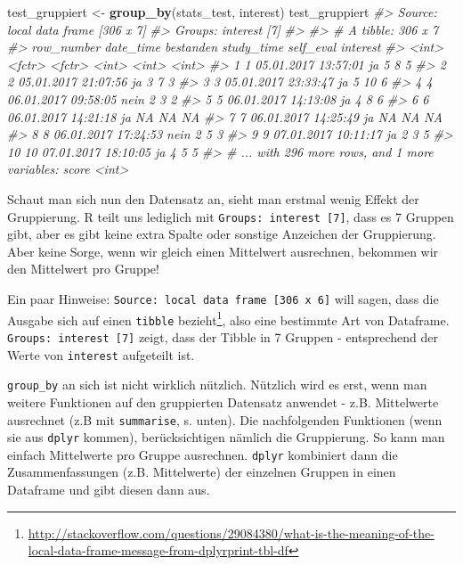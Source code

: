 \documentclass[12pt,ngerman,]{book}
\makeatletter
\newenvironment{Shaded}{\begin{snugshade}}{\end{snugshade}}
\newcommand{\KeywordTok}[1]{\textcolor[rgb]{0.13,0.29,0.53}{\textbf{{#1}}}}
\newcommand{\StringTok}[1]{\textcolor[rgb]{0.31,0.60,0.02}{{#1}}}
\newcommand{\CommentTok}[1]{\textcolor[rgb]{0.56,0.35,0.01}{\textit{{#1}}}}
\newcommand{\NormalTok}[1]{{#1}}
\let\rmarkdownfootnote\footnote%
\def\footnote{\protect\rmarkdownfootnote}
\newenvironment{kframe}{%
\medskip{}
\setlength{\fboxsep}{.8em}
 \def\at@end@of@kframe{}%
 \ifinner\ifhmode%
  \def\at@end@of@kframe{\end{minipage}}%
  \begin{minipage}{\columnwidth}%
 \fi\fi%
 \def\FrameCommand##1{\hskip\@totalleftmargin \hskip-\fboxsep
 \colorbox{shadecolor}{##1}\hskip-\fboxsep
     \hskip-\linewidth \hskip-\@totalleftmargin \hskip\columnwidth}%
 \MakeFramed {\advance\hsize-\width
   \@totalleftmargin\z@ \linewidth\hsize
   \@setminipage}}%
 {\par\unskip\endMakeFramed%
 \at@end@of@kframe}
\renewenvironment{Shaded}{\begin{kframe}}{\end{kframe}}
\theoremstyle{definition}
\theoremstyle{definition}
\theoremstyle{remark}
\makeatother
\begin{document}
\begin{Shaded}
\begin{Highlighting}[]
\NormalTok{test_gruppiert <-}\StringTok{ }\KeywordTok{group_by}\NormalTok{(stats_test, interest)}
\NormalTok{test_gruppiert}
\CommentTok{#> Source: local data frame [306 x 7]}
\CommentTok{#> Groups: interest [7]}
\CommentTok{#> }
\CommentTok{#> # A tibble: 306 x 7}
\CommentTok{#>    row_number           date_time bestanden study_time self_eval interest}
\CommentTok{#>         <int>              <fctr>    <fctr>      <int>     <int>    <int>}
\CommentTok{#>  1          1 05.01.2017 13:57:01        ja          5         8        5}
\CommentTok{#>  2          2 05.01.2017 21:07:56        ja          3         7        3}
\CommentTok{#>  3          3 05.01.2017 23:33:47        ja          5        10        6}
\CommentTok{#>  4          4 06.01.2017 09:58:05      nein          2         3        2}
\CommentTok{#>  5          5 06.01.2017 14:13:08        ja          4         8        6}
\CommentTok{#>  6          6 06.01.2017 14:21:18        ja         NA        NA       NA}
\CommentTok{#>  7          7 06.01.2017 14:25:49        ja         NA        NA       NA}
\CommentTok{#>  8          8 06.01.2017 17:24:53      nein          2         5        3}
\CommentTok{#>  9          9 07.01.2017 10:11:17        ja          2         3        5}
\CommentTok{#> 10         10 07.01.2017 18:10:05        ja          4         5        5}
\CommentTok{#> # ... with 296 more rows, and 1 more variables: score <int>}
\end{Highlighting}
\end{Shaded}

Schaut man sich nun den Datensatz an, sieht man erstmal wenig Effekt der
Gruppierung. R teilt uns lediglich mit
\texttt{Groups:\ interest\ {[}7{]}}, dass es 7 Gruppen gibt, aber es
gibt keine extra Spalte oder sonstige Anzeichen der Gruppierung. Aber
keine Sorge, wenn wir gleich einen Mittelwert ausrechnen, bekommen wir
den Mittelwert pro Gruppe!

Ein paar Hinweise: \texttt{Source:\ local\ data\ frame\ {[}306\ x\ 6{]}}
will sagen, dass die Ausgabe sich auf einen \texttt{tibble}
bezieht\footnote{\url{http://stackoverflow.com/questions/29084380/what-is-the-meaning-of-the-local-data-frame-message-from-dplyrprint-tbl-df}},
also eine bestimmte Art von Dataframe.
\texttt{Groups:\ interest\ {[}7{]}} zeigt, dass der Tibble in 7 Gruppen
- entsprechend der Werte von \texttt{interest} aufgeteilt ist.

\texttt{group\_by} an sich ist nicht wirklich nützlich. Nützlich wird es
erst, wenn man weitere Funktionen auf den gruppierten Datensatz anwendet
- z.B. Mittelwerte ausrechnet (z.B mit \texttt{summarise}, s. unten).
Die nachfolgenden Funktionen (wenn sie aus \texttt{dplyr} kommen),
berücksichtigen nämlich die Gruppierung. So kann man einfach Mittelwerte
pro Gruppe ausrechnen. \texttt{dplyr} kombiniert dann die
Zusammenfassungen (z.B. Mittelwerte) der einzelnen Gruppen in einen
Dataframe und gibt diesen dann aus.
\end{document}
